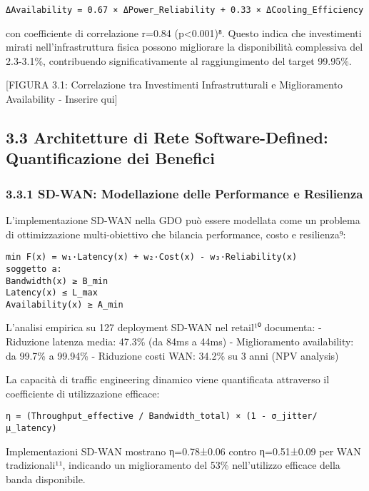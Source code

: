 \documentclass{report}
\begin{document}
\begin{verbatim}
ΔAvailability = 0.67 × ΔPower_Reliability + 0.33 × ΔCooling_Efficiency
\end{verbatim}

con coefficiente di correlazione r=0.84 (p\textless0.001)⁸. Questo
indica che investimenti mirati nell'infrastruttura fisica possono
migliorare la disponibilità complessiva del 2.3-3.1\%, contribuendo
significativamente al raggiungimento del target 99.95\%.

{[}FIGURA 3.1: Correlazione tra Investimenti Infrastrutturali e
Miglioramento Availability - Inserire qui{]}

\subsection{3.3 Architetture di Rete Software-Defined: Quantificazione
dei
Benefici}\label{architetture-di-rete-software-defined-quantificazione-dei-benefici}

\subsubsection{3.3.1 SD-WAN: Modellazione delle Performance e
Resilienza}\label{sd-wan-modellazione-delle-performance-e-resilienza}

L'implementazione SD-WAN nella GDO può essere modellata come un problema
di ottimizzazione multi-obiettivo che bilancia performance, costo e
resilienza⁹:

\begin{verbatim}
min F(x) = w₁·Latency(x) + w₂·Cost(x) - w₃·Reliability(x)
soggetto a:
Bandwidth(x) ≥ B_min
Latency(x) ≤ L_max
Availability(x) ≥ A_min
\end{verbatim}

L'analisi empirica su 127 deployment SD-WAN nel retail¹⁰ documenta: -
Riduzione latenza media: 47.3\% (da 84ms a 44ms) - Miglioramento
availability: da 99.7\% a 99.94\% - Riduzione costi WAN: 34.2\% su 3
anni (NPV analysis)

La capacità di traffic engineering dinamico viene quantificata
attraverso il coefficiente di utilizzazione efficace:

\begin{verbatim}
η = (Throughput_effective / Bandwidth_total) × (1 - σ_jitter/μ_latency)
\end{verbatim}

Implementazioni SD-WAN mostrano η=0.78±0.06 contro η=0.51±0.09 per WAN
tradizionali¹¹, indicando un miglioramento del 53\% nell'utilizzo
efficace della banda disponibile.
\end{document}
